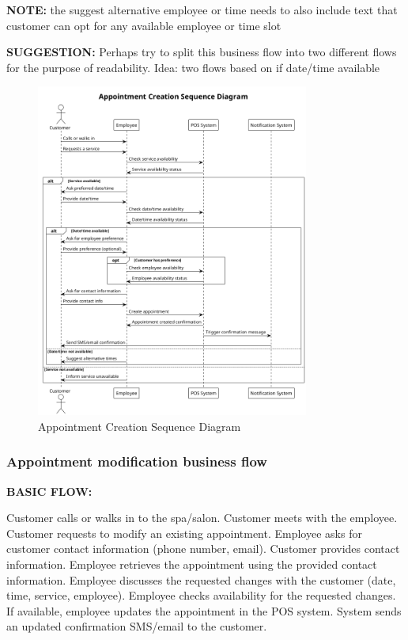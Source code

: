 \documentclass[]{VUMIFTemplateClass}
\newcommand{\noticecomment}[1]{%
    \begin{tcolorbox}[colback=blue!20, colframe=blue!60, arc=0pt, outer arc=0pt, boxrule=1pt, left=3pt, right=3pt, top=3pt, bottom=3pt]
        \textbf{\textcolor{blue!70!black}{NOTE:}} #1
    \end{tcolorbox}
}
\newcommand{\suggestioncomment}[1]{%
    \definecolor{lime}{RGB}{50,205,50}%
    \begin{tcolorbox}[colback=lime!15, colframe=lime!60, arc=0pt, outer arc=0pt, boxrule=1pt, left=3pt, right=3pt, top=3pt, bottom=3pt]
        \textbf{\textcolor{lime!70!black}{SUGGESTION:}} #1
    \end{tcolorbox}%
}
\begin{document}
\noticecomment{the suggest alternative employee or time needs to also include text that customer can opt for any available employee or time slot}

\suggestioncomment{Perhaps try to split this business flow into two different flows for the purpose of readability. Idea: two flows based on if date/time available}

\begin{figure}[H]
    \centering
    \includegraphics[width=0.8\textwidth]{images/diagrams/services/appointment_creation_sequence.png}
    \caption{Appointment Creation Sequence Diagram}
    \label{fig:appointment_creation_sequence}
\end{figure}

\subsubsection{Appointment modification business flow}

\textbf{BASIC FLOW:}

Customer calls or walks in to the spa/salon.
Customer meets with the employee.
Customer requests to modify an existing appointment.
Employee asks for customer contact information (phone number, email).
Customer provides contact information.
Employee retrieves the appointment using the provided contact information.
Employee discusses the requested changes with the customer (date, time, service, employee).
Employee checks availability for the requested changes.
If available, employee updates the appointment in the POS system.
System sends an updated confirmation SMS/email to the customer.
\end{document}
